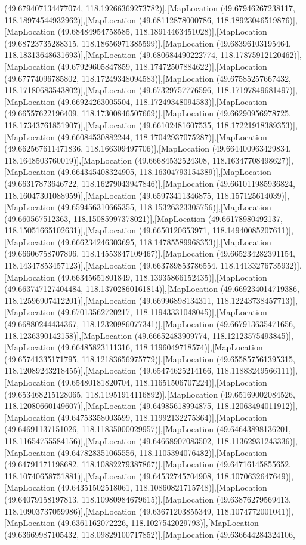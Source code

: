 (49.679407134477074, 118.19266369273782)],[MapLocation (49.67946267238117, 118.18974544932962)],[MapLocation (49.68112878000786, 118.18923046519876)],[MapLocation (49.68484954758585, 118.18914463451028)],[MapLocation (49.68723735288315, 118.18656971385599)],[MapLocation (49.68396103195464, 118.18313648631693)],[MapLocation (49.680684490222774, 118.17875912120462)],[MapLocation (49.67929605847859, 118.17472507884622)],[MapLocation (49.67774096785802, 118.17249348094583)],[MapLocation (49.67585257667432, 118.17180683543802)],[MapLocation (49.67329757776596, 118.17197849681497)],[MapLocation (49.66924263005504, 118.17249348094583)],[MapLocation (49.66557622196409, 118.17300846507669)],[MapLocation (49.66290956978725, 118.17343761851907)],[MapLocation (49.66102481607535, 118.17221918389353)],[MapLocation (49.66084530882244, 118.17042937075287)],[MapLocation (49.662567611471836, 118.166309497706)],[MapLocation (49.664400963429834, 118.1648503760019)],[MapLocation (49.66684532524308, 118.16347708498627)],[MapLocation (49.664345408324905, 118.16304793154389)],[MapLocation (49.66317873646722, 118.16279043947846)],[MapLocation (49.661011985936824, 118.16047301088959)],[MapLocation (49.65973411346875, 118.157125614039)],[MapLocation (49.659456310665355, 118.15326323305756)],[MapLocation (49.660567512363, 118.15085997378021)],[MapLocation (49.66178980492137, 118.15051665102631)],[MapLocation (49.6650120653971, 118.14940085207611)],[MapLocation (49.666234246303695, 118.14785589968353)],[MapLocation (49.66606758707896, 118.14553847109467)],[MapLocation (49.665234282391154, 118.14347853457123)],[MapLocation (49.663789853786554, 118.14133276735932)],[MapLocation (49.66345651801849, 118.13935866152435)],[MapLocation (49.663747127404484, 118.13702860161814)],[MapLocation (49.669234014719386, 118.12596907412201)],[MapLocation (49.66996898134311, 118.12243738457713)],[MapLocation (49.67013562720217, 118.11943331048045)],[MapLocation (49.66880244434367, 118.12320986077341)],[MapLocation (49.667913635471656, 118.1236390142158)],[MapLocation (49.66652483909774, 118.12123575493845)],[MapLocation (49.66485823111316, 118.1196049718574)],[MapLocation (49.65741335171795, 118.12183656975779)],[MapLocation (49.655857561395315, 118.12089243218455)],[MapLocation (49.65474625214166, 118.11883249566111)],[MapLocation (49.65480181820704, 118.11651506707224)],[MapLocation (49.653468215128065, 118.11951914116892)],[MapLocation (49.65169002084526, 118.12080660149607)],[MapLocation (49.64985618994875, 118.12063494011912)],[MapLocation (49.64753358003599, 118.11992132275364)],[MapLocation (49.64691137151026, 118.11835000029957)],[MapLocation (49.64643898136201, 118.11654755584156)],[MapLocation (49.64668907083502, 118.11362931243336)],[MapLocation (49.647828351065556, 118.1105394076482)],[MapLocation (49.64791171198682, 118.10882279387867)],[MapLocation (49.64716145855652, 118.10740658751881)],[MapLocation (49.64532745704908, 118.1070632647649)],[MapLocation (49.64351502518061, 118.10860821715748)],[MapLocation (49.64079158197813, 118.10980984679615)],[MapLocation (49.63876279569413, 118.10903737059986)],[MapLocation (49.63671203855349, 118.1074772001041)],[MapLocation (49.6361162072226, 118.1027542029793)],[MapLocation (49.63669987105432, 118.09829100717852)],[MapLocation (49.636644284324106, 